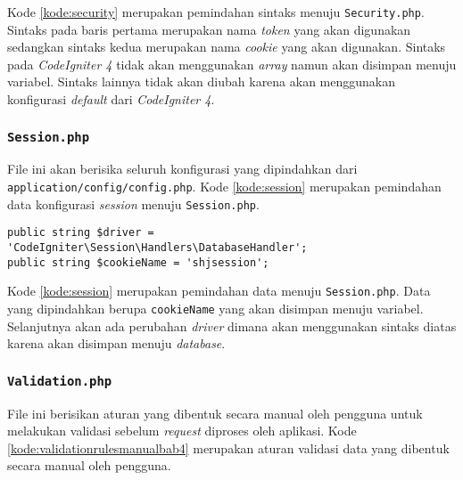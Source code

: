 Kode \ref{kode:security} merupakan pemindahan sintaks menuju \texttt{Security.php}. Sintaks pada baris pertama merupakan nama \textit{token} yang akan digunakan sedangkan sintaks kedua merupakan nama \textit{cookie} yang akan digunakan. Sintaks pada \textit{CodeIgniter 4} tidak akan menggunakan \textit{array} namun akan disimpan menuju variabel. Sintaks lainnya tidak akan diubah karena akan menggunakan konfigurasi \textit{default} dari \textit{CodeIgniter 4}.

\subsubsection{\texttt{Session.php}}
File ini akan berisika seluruh konfigurasi yang dipindahkan dari \texttt{application/config/config.php}. Kode \ref{kode:session} merupakan pemindahan data konfigurasi \textit{session} menuju \texttt{Session.php}.
\begin{lstlisting}[caption=Pemindahan file \textit{config} menuju \textit{Session}, label=kode:session]
public string $driver = 'CodeIgniter\Session\Handlers\DatabaseHandler';
public string $cookieName = 'shjsession';
\end{lstlisting}

Kode \ref{kode:session} merupakan pemindahan data menuju \texttt{Session.php}. Data yang dipindahkan berupa \texttt{cookieName} yang akan disimpan menuju variabel. Selanjutnya akan ada perubahan \textit{driver} dimana akan menggunakan sintaks diatas karena akan disimpan menuju \textit{database}.

\subsubsection{\texttt{Validation.php}}
\label{subsubsec:validationbab4}
File ini berisikan aturan yang dibentuk secara manual oleh pengguna untuk melakukan validasi sebelum \textit{request} diproses oleh aplikasi. Kode \ref{kode:validationrulesmanualbab4} merupakan aturan validasi data yang dibentuk secara manual oleh pengguna.

